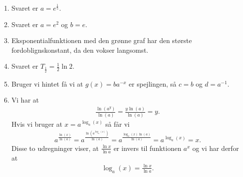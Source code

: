 \begin{enumerate}
	\item Svaret er $a=e^{\frac{1}{5}}$.
	
	
	\item Svaret er $a=e^2$ og $b=e$. 
	
	\item Eksponentialfunktionen med den grønne graf har den største fordoblignskonstant, da den vokser langsomst.
	


	\item Svaret er $T_{\frac{1}{2}}= \frac{1}{2}\ln 2$.
	
	
	\item Bruger vi hintet få vi at $g(x)=ba^{-x}$ er spejlingen, så $c=b$ og $d=a^{-1}$.
	
	
	\item\label{it:eks2ans} Vi har at
	\begin{align*}
	\frac{\ln(a^y)}{\ln(a)}=\frac{y\ln(a)}{\ln(a)}=y.
	\end{align*}
	Hvis vi bruger at $x=a^{\log_a(x)}$ så får vi
	\begin{align*}
	a^{\frac{\ln(x)}{\ln(a)}}=a^{\frac{\ln(a^{\log_a(x)})}{\ln(a)}}=a^{\frac{\log_a(x)\ln(a)}{\ln(a)}}=a^{\log_a(x)}=x.
	\end{align*}
	Disse to udregninger viser, at $\frac{\ln x}{\ln a}$ er invers til funktionen $a^x$ og vi har derfor at
	\begin{align*}
	\log_a(x)=\frac{\ln x}{\ln a}.
	\end{align*}
	
	
\end{enumerate}